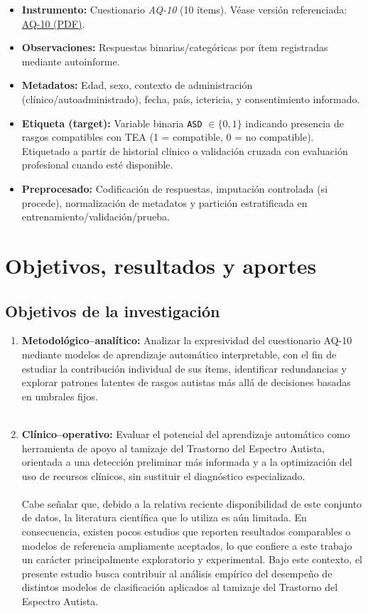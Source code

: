 \begin{itemize}[leftmargin=*,noitemsep]
  \item \textbf{Instrumento:} Cuestionario \textit{AQ-10} (10 ítems). Véase versión referenciada: \href{https://leademployer.merseywestlancs.nhs.uk/media/Neurodiversity/Adult-autism-AQ10-questionnaire-test-v1.pdf}{AQ-10 (PDF)}.
  \item \textbf{Observaciones:} Respuestas binarias/categóricas por ítem registradas mediante autoinforme.
  \item \textbf{Metadatos:} Edad, sexo, contexto de administración (clínico/autoadministrado), fecha, país, ictericia, y consentimiento informado.
  \item \textbf{Etiqueta (target):} Variable binaria \texttt{ASD} $\in\{0,1\}$ indicando presencia de rasgos compatibles con TEA (1 = compatible, 0 = no compatible). Etiquetado a partir de historial clínico o validación cruzada con evaluación profesional cuando esté disponible.
  \item \textbf{Preprocesado:} Codificación de respuestas, imputación controlada (si procede), normalización de metadatos y partición estratificada en entrenamiento/validación/prueba.
\end{itemize}

\section{Objetivos, resultados y aportes}
\subsection{Objetivos de la investigación}
\begin{enumerate}[leftmargin=*,noitemsep]
  \item \textbf{Metodológico–analítico:} Analizar la expresividad del cuestionario AQ-10 mediante modelos de aprendizaje automático interpretable, con el fin de estudiar la contribución individual de sus ítems, identificar redundancias y explorar patrones latentes de rasgos autistas más allá de decisiones basadas en umbrales fijos.\\\\
  \item \textbf{Clínico–operativo:} Evaluar el potencial del aprendizaje automático como herramienta de apoyo al tamizaje del Trastorno del Espectro Autista, orientada a una detección preliminar más informada y a la optimización del uso de recursos clínicos, sin sustituir el diagnóstico especializado. \\\\

Cabe señalar que, debido a la relativa reciente disponibilidad de este conjunto de datos, la literatura científica que lo utiliza es aún limitada. En consecuencia, existen pocos estudios que reporten resultados comparables o modelos de referencia ampliamente aceptados, lo que confiere a este trabajo un carácter principalmente exploratorio y experimental. Bajo este contexto, el presente estudio busca contribuir al análisis empírico del desempeño de distintos modelos de clasificación aplicados al tamizaje del Trastorno del Espectro Autista.
\end{enumerate}

